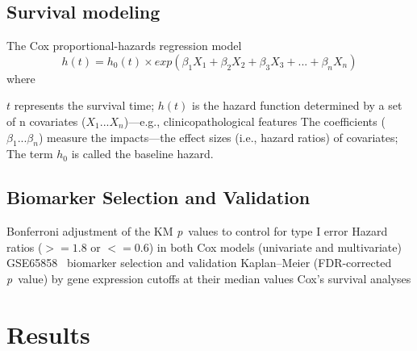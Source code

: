 \documentclass[
paper=landscape,
paper=160mm:90mm, %
fontsize=11pt, %
pagesize, %
parskip=half-, %
]{scrartcl} %
\theoremstyle{mythmstyle} %
\begin{document}
\clearpage

\subsection{Survival modeling}
\large The Cox proportional-hazards regression model~\cite{Cox1972,Andersen1982,Bradburn2003b}\\
$$h(t) = h_0(t) \times exp(\beta_1 X_1 + \beta_2 X_2 + \beta_3 X_3 + ... + \beta_n X_n)$$
\noindent where
\begin{outline} %
\1 $t$ represents the survival time;
\1 $h(t)$ is the hazard function determined by a set of n covariates ($X_1...X_n$)---e.g., clinicopathological features
\1 The coefficients ($\beta_1...\beta_n$) measure the impacts---the effect sizes (i.e., hazard ratios) of covariates;
\1 The term $h_0$ is called the baseline hazard.
\end{outline}


\clearpage

\subsection{Biomarker Selection and Validation}
\begin{outline}


\1 \large Bonferroni adjustment of the KM \textit{p}~values to control for type I error
\1 Hazard ratios ($>=1.8$ or $<=0.6$) in both Cox models (univariate and multivariate)
\1 GSE65858~\cite{Wichmann2015}
    \2 biomarker selection and validation
    \2 Kaplan--Meier (FDR-corrected \textit{p}~value) by gene expression cutoffs at their median values
    \2 Cox's survival analyses 

\end{outline}
\clearpage



\section{Results}

\thispagestyle{headings}
\end{document}

